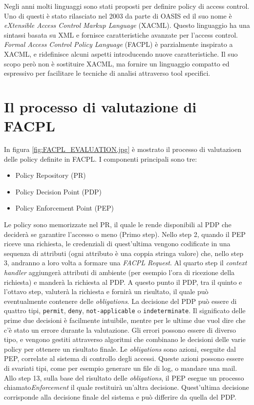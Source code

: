 Negli anni molti linguaggi sono stati proposti per definire policy di access control. Uno di questi è stato rilasciato nel 2003 da parte di OASIS ed il suo nome è \textit{eXtensible Access Control Markup Language} (XACML). Questo linguaggio ha una sintassi basata su XML e fornisce caratteristiche avanzate per l'access control. \textit{Formal Access Control Policy Language} (FACPL) è parzialmente inspirato a XACML, e ridefinisce alcuni aspetti introducendo nuove caratteristiche. Il suo scopo però non è sostituire XACML, ma fornire un linguaggio compatto ed espressivo per facilitare le tecniche di analisi attraverso tool specifici.
\section{Il processo di valutazione di FACPL}


In figura \ref{fig:FACPL_EVALUATION.jpg} è mostrato il processo di valutazioen delle policy definite in FACPL.
I componenti principali sono tre:
\begin{itemize}
\item{Policy Repository (PR)}
\item{Policy Decision Point (PDP)}
\item{Policy Enforcement Point (PEP)}
\end{itemize}
Le policy sono memorizzate nel PR, il quale le rende disponibili al PDP che deciderà se garantire l'accesso o meno (Primo step).
Nello step 2, quando il PEP riceve una richiesta, le credenziali di quest'ultima vengono codificate in una sequenza di attributi (ogni attributo è una coppia stringa valore) che, nello step 3, andranno a loro volta a formare una \textit{FACPL Request}.
Al quarto step il \textit{context handler} aggiungerà attributi di ambiente (per esempio l'ora di ricezione della richiesta) e manderà la richiesta al PDP.
A questo punto il PDP, tra il quinto e l'ottavo step, valuterà la richiesta e fornirà un risultato, il quale può eventualmente contenere delle \textit{obligations}.
La decisione del PDP può essere di quattro tipi, \texttt{permit}, \texttt{deny}, \texttt{not-applicable} o \texttt{indeterminate}.
Il significato delle prime due decisioni è facilmente intuibile, mentre per le ultime due vuol dire che c'è stato un errore durante la valutazione.
Gli errori possono essere di diverso tipo, e vengono gestiti attraverso algoritmi che combinano le decisioni delle varie policy per ottenere un risultato finale.
Le \textit{obligations} sono azioni, eseguite dal PEP, correlate al sistema di controllo degli accessi. Queste azioni possono essere di svariati tipi, come per esempio generare un file di log, o mandare una mail.
Allo step 13, sulla base del risultato delle \textit{obligations}, il PEP esegue un processo chiamato\textit{Enforcement} il quale restituirà un'altra decisione.
Quest'ultima decisione corrisponde alla decisione finale del sistema e può differire da quella del PDP.


